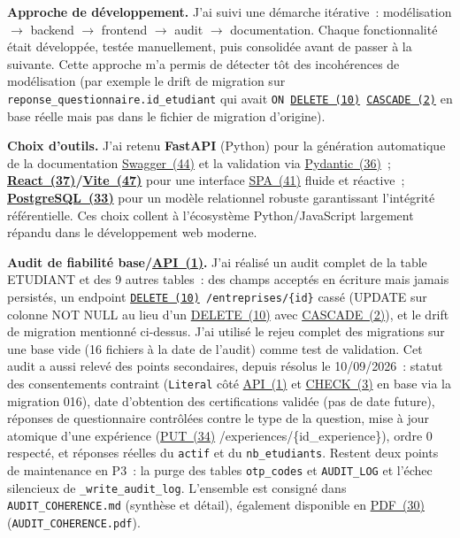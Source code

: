 \documentclass[12pt,a4paper]{report}
\begin{document}
\textbf{Approche de développement.} J'ai suivi une démarche itérative~: modélisation $\rightarrow$ backend $\rightarrow$ frontend $\rightarrow$ audit $\rightarrow$ documentation. Chaque fonctionnalité était développée, testée manuellement, puis consolidée avant de passer à la suivante. Cette approche m'a permis de détecter tôt des incohérences de modélisation (par exemple le drift de migration sur \texttt{reponse\_questionnaire.id\_etudiant} qui avait \texttt{ON \hyperlink{abbr-DELETE}{DELETE~(10)} \hyperlink{abbr-CASCADE}{CASCADE~(2)}} en base réelle mais pas dans le fichier de migration d'origine).

\textbf{Choix d'outils.} J'ai retenu \textbf{FastAPI} (Python) pour la génération automatique de la documentation \hyperlink{abbr-Swagger}{Swagger~(44)} et la validation via \hyperlink{abbr-Pydantic}{Pydantic~(36)}~; \textbf{\hyperlink{abbr-React}{React~(37)}/\hyperlink{abbr-Vite}{Vite~(47)}} pour une interface \hyperlink{abbr-SPA}{SPA~(41)} fluide et réactive~; \textbf{\hyperlink{abbr-PostgreSQL}{PostgreSQL~(33)}} pour un modèle relationnel robuste garantissant l'intégrité référentielle. Ces choix collent à l'écosystème Python/JavaScript largement répandu dans le développement web moderne.

\textbf{Audit de fiabilité base/\hyperlink{abbr-API}{API~(1)}.} J'ai réalisé un audit complet de la table ETUDIANT et des 9 autres tables~: des champs acceptés en écriture mais jamais persistés, un endpoint \texttt{\hyperlink{abbr-DELETE}{DELETE~(10)} /entreprises/\{id\}} cassé (UPDATE sur colonne NOT NULL au lieu d'un \hyperlink{abbr-DELETE}{DELETE~(10)} avec \hyperlink{abbr-CASCADE}{CASCADE~(2)}), et le drift de migration mentionné ci-dessus. J'ai utilisé le rejeu complet des migrations sur une base vide (16 fichiers à la date de l'audit) comme test de validation. Cet audit a aussi relevé des points secondaires, depuis résolus le 10/09/2026~: statut des consentements contraint (\texttt{Literal} côté \hyperlink{abbr-API}{API~(1)} et \hyperlink{abbr-CHECK}{CHECK~(3)} en base via la migration 016), date d'obtention des certifications validée (pas de date future), réponses de questionnaire contrôlées contre le type de la question, mise à jour atomique d'une expérience (\hyperlink{abbr-PUT}{PUT~(34)} /experiences/\{id\_experience\}), ordre 0 respecté, et réponses réelles du \texttt{actif} et du \texttt{nb\_etudiants}. Restent deux points de maintenance en P3~: la purge des tables \texttt{otp\_codes} et \texttt{AUDIT\_LOG} et l'échec silencieux de \texttt{\_write\_audit\_log}. L'ensemble est consigné dans \texttt{AUDIT\_COHERENCE.md} (synthèse et détail), également disponible en \hyperlink{abbr-PDF}{PDF~(30)} (\texttt{AUDIT\_COHERENCE.pdf}).
\end{document}
